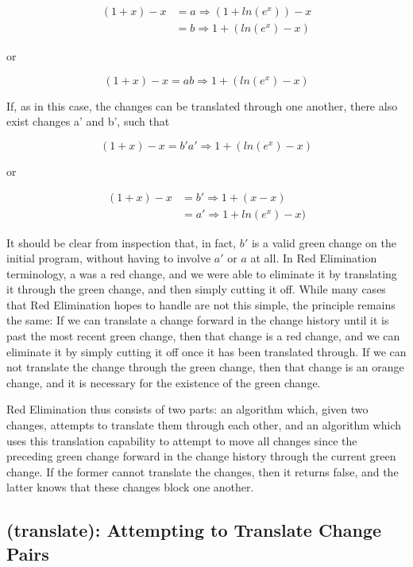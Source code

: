 \documentclass{article}
\newcommand{\insetarrow}[1]{=#1\Rightarrow}
\newcommand{\lnexp}[1]{ln\left(e^{#1}\right)}
\begin{document}
\begin{align*}
(1 + x) - x&\insetarrow{a} (1 + \lnexp{x}) - x\\
&\insetarrow{b} 1 + (\lnexp{x} - x)
\end{align*}

or 

\[(1 + x) - x \insetarrow{ab} 1 + (\lnexp{x} - x)\]

If, as in this case, 
the changes can be translated through one another, 
there also exist changes a' and b', 
such that 

\[(1 + x) - x \insetarrow{b'a'} 1 + (\lnexp{x} - x)\]

or

\begin{align*}
(1 + x) - x &\insetarrow{b'} 1 + (x - x) \\
&\insetarrow{a'} 1 + \lnexp{x} - x)
\end{align*}


It should be clear from inspection that, in fact, 
$b'$ is a valid green change on the initial program, 
without having to involve $a'$ or $a$ at all. 
In Red Elimination terminology, 
a was a red change, 
and we were able to eliminate it 
by translating it through the green change, 
and then simply cutting it off. 
While many cases that Red Elimination hopes to handle 
are not this simple, 
the principle remains the same: 
If we can translate a change 
forward in the change history 
until it is past the most recent green change, 
then that change is a red change, 
and we can eliminate it by simply cutting it off 
once it has been translated through. 
If we can not translate the change through the green change, 
then that change is an orange change, 
and it is necessary for the existence of the green change.

Red Elimination thus consists of two parts: 
an algorithm which, given two changes, 
attempts to translate them through each other, 
and an algorithm which uses this translation capability 
to attempt to move all changes since the preceding green change 
forward in the change history 
through the current green change. 
If the former cannot translate the changes, 
then it returns false, 
and the latter knows that these changes block one another.

\subsection{(translate): Attempting to Translate Change Pairs}
\end{document}
